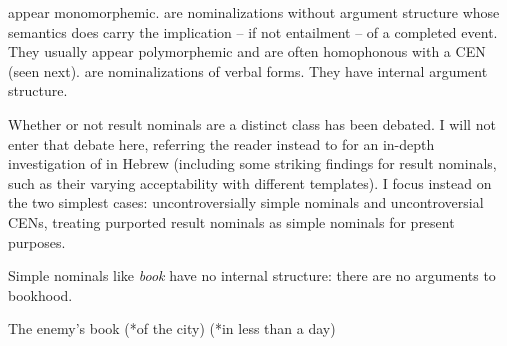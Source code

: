 \begin{exe}
\begin{xlist}
\begin{exe}
\begin{xlist}
\begin{exe}
\begin{exe}
\begin{xlist}
\begin{exe}
\begin{exe}
\begin{xlist}
\begin{exe}
\begin{xlist}
\begin{exe}
\begin{xlist}
\begin{exe}
\begin{xlist}
\begin{exe}
\begin{xlist}
\begin{xlist}
\begin{exe}
\begin{xlist}
\begin{exe}
\begin{xlist}
\begin{exe}
\begin{exe}
\begin{exe}
\begin{xlist}
\begin{exe}
\begin{exe}
\begin{xlist}
\begin{exe}
\begin{xlist}
\begin{exe}
\begin{xlist}
\begin{exe}
\begin{xlist}
\begin{xlist}
\begin{exe}
\begin{xlist}
\begin{exe}
\begin{xlist}
\begin{exe}
\begin{xlist}
\begin{exe}
\begin{xlist}
\begin{exe}
\begin{exe}
\begin{exe}
\begin{exe}
\begin{exe}
\begin{xlist}
\begin{xlist}
\begin{exe}
\begin{xlist}
\begin{exe}
\begin{xlist}
\begin{exe}
\begin{exe}
\begin{exe}
\begin{xlist}
\begin{exe}
\begin{xlist}
\begin{exe}
\begin{xlist}
\begin{exe}
 \begin{exe}
 \ex  \label{ex:5n53}
 \begin{xlist} 
 	\ex  {} appear monomorphemic. 
 	\ex  {} are nominalizations without argument structure whose semantics does carry the implication -- if not entailment -- of a completed event. They usually appear polymorphemic and are often homophonous with a CEN (seen next). 
 	\ex  {} are nominalizations of verbal forms. They have internal argument structure. 
 \z
\z 

Whether or not result nominals are a distinct class has been debated. I will not enter that debate here, referring the reader instead to \cite{ahdout19glow,ahdout19phd} for an in-depth investigation of  in Hebrew (including some striking findings for result nominals, such as their varying acceptability with different templates). I focus instead on the two simplest cases: uncontroversially simple nominals and uncontroversial CENs, treating purported result nominals as simple nominals for present purposes.

Simple nominals like \emph{book }have no internal structure: there are no arguments to bookhood.
 \begin{exe}
\ex  The enemy's book (*of the city) (*in less than a day) 
 \z 	


\end{exe}
\end{xlist}
\end{exe}
\end{exe}
\end{xlist}
\end{exe}
\end{xlist}
\end{exe}
\end{xlist}
\end{exe}
\end{exe}
\end{exe}
\end{xlist}
\end{exe}
\end{xlist}
\end{exe}
\end{xlist}
\end{xlist}
\end{exe}
\end{exe}
\end{exe}
\end{exe}
\end{exe}
\end{xlist}
\end{exe}
\end{xlist}
\end{exe}
\end{xlist}
\end{exe}
\end{xlist}
\end{exe}
\end{xlist}
\end{xlist}
\end{exe}
\end{xlist}
\end{exe}
\end{xlist}
\end{exe}
\end{xlist}
\end{exe}
\end{exe}
\end{xlist}
\end{exe}
\end{exe}
\end{exe}
\end{xlist}
\end{exe}
\end{xlist}
\end{exe}
\end{xlist}
\end{xlist}
\end{exe}
\end{xlist}
\end{exe}
\end{xlist}
\end{exe}
\end{xlist}
\end{exe}
\end{xlist}
\end{exe}
\end{exe}
\end{xlist}
\end{exe}
\end{exe}
\end{xlist}
\end{exe}
\end{xlist}
\end{exe}
